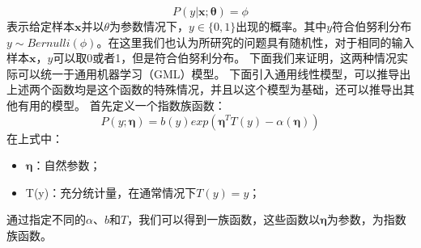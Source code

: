 \documentclass[UTF8]{article}
\begin{document}
\begin{equation}
P(y \vert \boldsymbol{x}; \boldsymbol{\theta}) = \phi
\label{lcrn-lcrn-prob}
\end{equation}
表示给定样本$\boldsymbol{x}$并以$\theta$为参数情况下，$y \in \{0, 1\}$出现的概率。其中$y$符合伯努利分布$y \sim Bernulli(\phi)$。在这里我们也认为所研究的问题具有随机性，对于相同的输入样本$\boldsymbol{x}$，$y$可以取0或者1，但是符合伯努利分布。\newline
下面我们来证明，这两种情况实际可以统一于通用机器学习（GML）模型。\newline
下面引入通用线性模型，可以推导出上述两个函数均是这个函数的特殊情况，并且以这个模型为基础，还可以推导出其他有用的模型。\newline
首先定义一个指数族函数：
\begin{equation}
P(y;\boldsymbol{\eta}) = b(y)exp(\boldsymbol{\eta}^{T}T(y)-\alpha(\boldsymbol{\eta}))
\label{lcrn-exp-function-group}
\end{equation}
在上式中：
\begin{itemize}
\item $\boldsymbol{\eta}$：自然参数；
\item T(y)：充分统计量，在通常情况下$T(y)=y$；
\end{itemize}
通过指定不同的$\alpha$、$b$和$T$，我们可以得到一族函数，这些函数以$\boldsymbol{\eta}$为参数，为指数族函数。
\end{document}
